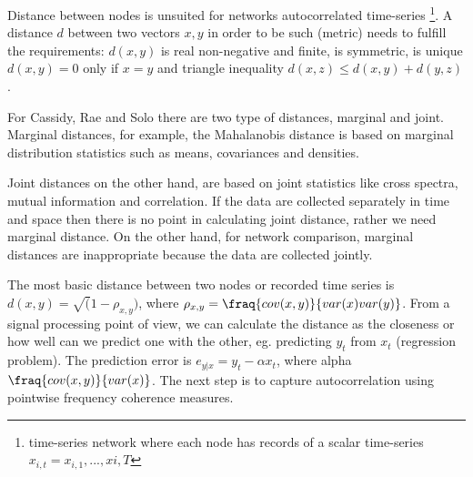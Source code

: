 \documentclass[onecollarge,runningheads]{svjour2}
\begin{document}
Distance between nodes is unsuited for networks autocorrelated time-series \footnote{time-series network where each node has records of a scalar time-series $x_{i,t} = x_{i,1},..., x{i,T}$}. %
A distance $d$ between two vectors $x,y$ in order to be such (metric) needs to fulfill the requirements: $d(x,y)$ is real non-negative and finite, is symmetric, is unique $d(x,y)=0$  only if $x=y$ and triangle inequality $d(x,z) \leq  d(x,y) + d(y,z)$.

For Cassidy, Rae and Solo there are two type of distances, marginal and joint. Marginal distances, for example, the Mahalanobis distance is based on marginal distribution statistics such as means, covariances and densities. 

Joint distances on the other hand, are based on joint statistics like cross spectra, mutual information and correlation. If the data are collected separately in time and space then there is no point in calculating joint distance, rather we need marginal distance. On the other hand, for network comparison, marginal distances are inappropriate because the data are collected jointly. 

The most basic distance between two nodes or recorded time series is $d(x,y) = \sqrt(1 - \rho_{x,y})$, where $\rho_{x,y}=\fraq{cov(x,y)}{var(x)var(y)}$. From a signal processing point of view, we can calculate the distance as the closeness or how well can we predict one with the other, eg. predicting $y_t$ from $x_t$ (regression problem). The prediction error is $e_{y|x} = y_t - \alpha x_t$, where alpha $\fraq{cov(x,y)}{var(x)}$.
The next step is to capture autocorrelation using pointwise frequency coherence measures.
\end{document}
